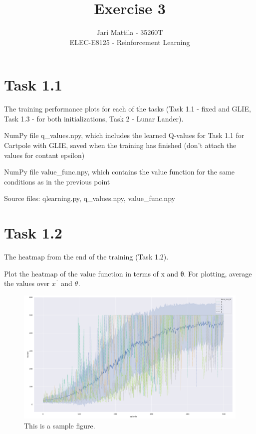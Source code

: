 \documentclass[12pt]{article}
\begin{document}
 
\title{Exercise 3}
\author{
Jari Mattila - 35260T\\
ELEC-E8125 - Reinforcement Learning}

\maketitle
\section*{Task 1.1}

The training performance plots for each of the tasks (Task 1.1 - fixed and GLIE, Task
1.3 - for both initializations, Task 2 - Lunar Lander).
\newline

NumPy file q\_values.npy, which includes the learned Q-values for Task 1.1 for Cartpole with GLIE, saved when the training has finished (don’t attach the values for contant epsilon)
\newline

NumPy file value\_func.npy, which contains the value function for the same conditions as in the previous point
\newline

\noindent
Source files: qlearning.py, q\_values.npy, value\_func.npy

\section*{Task 1.2}

The heatmap from the end of the training (Task 1.2).
\newline

Plot the heatmap of the value function in terms of x and θ. For plotting, average the
values over $x^{´}$ and $\theta^{}$.

\begin{figure}[h] 
	\centering  %
    \includegraphics[width=0.9\columnwidth]{img/training.pdf}
	\caption{This is a sample figure.}
	\label{fig:fig1}
\end{figure}
\end{document}
